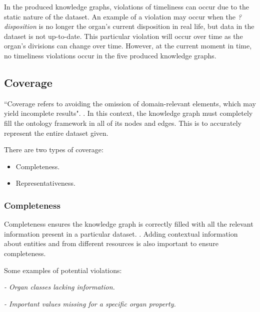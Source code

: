 In the produced knowledge graphs, violations of timeliness can occur due to the static nature of the dataset. An example of a violation may occur when the \textit{?disposition} is no longer the organ's current disposition in real life, but data in the dataset is not up-to-date. This particular violation will occur over time as the organ's divisions can change over time. However, at the current moment in time, no timeliness violations occur in the five produced knowledge graphs.

\subsection{Coverage}
\hspace{0.5cm} ``Coverage refers to avoiding the omission of domain-relevant elements, which may yield incomplete results". \cite{knowledgegraphevaulationbook}. In this context, the knowledge graph must completely fill the ontology framework in all of its nodes and edges. This is to accurately represent the entire dataset given. 

\noindent There are two types of coverage: 

\vspace{-0.15cm}
\begin{itemize}
\itemsep0em 
\item Completeness.
\vspace{-0.1cm}
\item Representativeness.
\end{itemize}
\vspace{-0.4cm}

\subsubsection{Completeness}
\hspace{0.5cm} Completeness ensures the knowledge graph is correctly filled with all the relevant information present in a particular dataset. \cite{knowledgegraphevaulationbook}. Adding contextual information about entities and from different resources \cite{evaluationpaper} is also important to ensure completeness. 

\noindent Some examples of potential violations:

\vspace{-0.15cm}
\begin{displayquote}
    \textit{- Organ classes lacking information.}
\end{displayquote}
\vspace{-0.6cm}
\begin{displayquote}
    \textit{- Important values missing for a specific organ property.}
\end{displayquote}
\vspace{-0.1cm}

